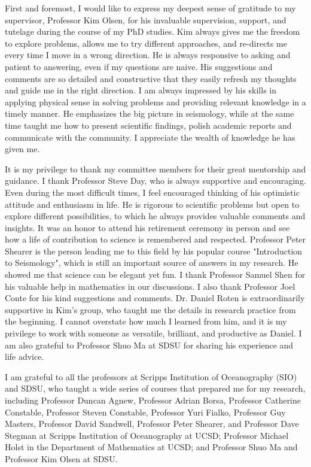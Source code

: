 \begin{frontmatter}
\begin{acknowledgements}
        First and foremost, I would like to express my deepest sense of gratitude to my supervisor, Professor Kim Olsen, for his invaluable supervision, support, and tutelage during the course of my PhD studies. Kim always gives me the freedom to explore problems, allows me to try different approaches, and re-directs me every time I move in a wrong direction. He is always responsive to asking and patient to answering, even if my questions are naive. His suggestions and comments are so detailed and constructive that they easily refresh my thoughts and guide me in the right direction. I am always impressed by his skills in applying physical sense in solving problems and providing relevant knowledge in a timely manner. He emphasizes the big picture in seismology, while at the same time taught me how to present scientific findings, polish academic reports and communicate with the community. I appreciate the wealth of knowledge he has given me.

        It is my privilege to thank my committee members for their great mentorship and guidance. I thank Professor Steve Day, who is always supportive and encouraging. Even during the most difficult times, I feel encouraged thinking of his optimistic attitude and enthusiasm in life. He is rigorous to scientific problems but open to explore different possibilities, to which he always provides valuable comments and insights. It was an honor to attend his retirement ceremony in person and see how a life of contribution to science is remembered and respected. Professor Peter Shearer is the person leading me to this field by his popular course "Introduction to Seismology", which is still an important source of answers in my research. He showed me that science can be elegant yet fun. I thank Professor Samuel Shen for his valuable help in mathematics in our discussions. I also thank Professor Joel Conte for his kind suggestions and comments. Dr. Daniel Roten is extraordinarily supportive in Kim's group, who taught me the details in research practice from the beginning. I cannot overstate how much I learned from him, and it is my privilege to work with someone as versatile, brilliant, and productive as Daniel. I am also grateful to Professor Shuo Ma at SDSU for sharing his experience and life advice.

        I am grateful to all the professors at Scripps Institution of Oceanography (SIO) and SDSU, who taught a wide series of courses that prepared me for my research, including Professor Duncan Agnew, Professor Adrian Borsa, Professor Catherine Constable, Professor Steven Constable, Professor Yuri Fialko, Professor Guy Masters, Professor David Sandwell, Professor Peter Shearer, and Professor Dave Stegman at Scripps Institution of Oceanography at UCSD; Professor Michael Holst in the Department of Mathematics at UCSD; and Professor Shuo Ma and Professor Kim Olsen at SDSU.


\end{acknowledgements}
\end{frontmatter}
